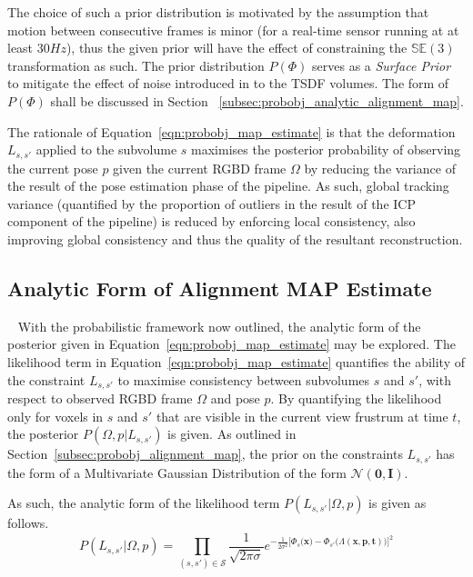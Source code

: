 The choice of such a prior distribution is motivated by the assumption that motion between 
consecutive frames is minor (for a real-time sensor running at at least \( 30Hz \)),
thus the given prior will have the effect of constraining the \(\mathbb{SE}(3)\)
transformation as such. The prior distribution \(P(\Phi)\) serves as a
\textit{Surface Prior} to mitigate the effect of noise introduced in to the TSDF
volumes. The form of \(P(\Phi)\) shall be discussed in Section
~\ref{subsec:probobj_analytic_alignment_map}.

The rationale of Equation~\ref{eqn:probobj_map_estimate} is that the deformation
\(L_{s, s'}\) applied to the subvolume \(s\) maximises the posterior probability of
observing the current pose \(p\) given the current RGBD frame \( \Omega \) by reducing
the variance of the result of the pose estimation phase of the pipeline. As such,
global tracking variance (quantified by the proportion of outliers in the result
of the ICP component of the pipeline) is reduced by enforcing local consistency,
also improving global consistency and thus the quality of the resultant
reconstruction.

\subsection{Analytic Form of Alignment MAP Estimate}
~\label{subsec:probobj_analytic_alignment_map}
With the probabilistic framework now outlined, the analytic form of the
posterior given in Equation~\ref{eqn:probobj_map_estimate} may be explored. The
likelihood term in Equation~\ref{eqn:probobj_map_estimate} quantifies the
ability of the constraint \(L_{s, s'}\) to maximise consistency between subvolumes
\(s\) and \(s'\), with respect to observed RGBD frame \( \Omega \) and pose \(p\). By
quantifying the likelihood only for voxels in \(s\) and \(s'\) that are visible in
the current view frustrum at time \(t\), the posterior \(P(\Omega, p | L_{s, s'})\)
is given. As outlined in Section~\ref{subsec:probobj_alignment_map}, the prior
on the constraints \(L_{s, s'}\) has the form of a Multivariate Gaussian
Distribution of the form \(\mathcal{N}(\bm{0}, \bm{I})\).

As such, the analytic form of the likelihood term \(P(L_{s, s'} | \Omega, p)\) is
given as follows.
\begin{equation}
  \label{eqn:probobj_likelihood_analytic}
  P(L_{s, s'} | \Omega, p) = \prod_{(s, s') \in \mathcal{S}}
  \frac{1}{\sqrt{2 \pi \sigma}}
  e^{-\frac{1}{2\sigma^{2}} {\Big[
      \Phi_{s}\big(\bm{x}\big) - \Phi_{s'}\big(\Lambda(\bm{x}, \bm{p}, \bm{t})\big)
    \Big]}^{2}
  }
\end{equation}

